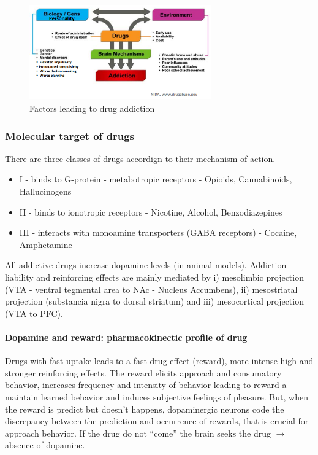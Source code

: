 \documentclass[12pt,article,oneside,a4paper]{memoir}
\begin{document}
\begin{figure}
  \centering
  \includegraphics[width=0.7\textwidth]{imgs/drug-addiction-factors.png}
  \caption{Factors leading to drug addiction}
  \label{fig:drug-addiction-factors}
\end{figure}

\subsubsection{Molecular target of drugs}
There are three classes of drugs accordign to their mechanism of action.

\begin{itemize}
\item I - binds to G-protein - metabotropic receptors - Opioids, Cannabinoids,
Hallucinogens
\item II - binds to ionotropic receptors - Nicotine, Alcohol, Benzodiazepines
\item III - interacts with monoamine transporters (GABA receptors) - Cocaine,
Amphetamine
\end{itemize}

All addictive drugs increase dopamine levels (in animal models). Addiction
liability and reinforcing effects are mainly mediated by i) mesolimbic
projection (VTA - ventral tegmental area to NAc - Nucleus Accumbens), ii)
mesostriatal projection (substancia nigra to dorsal striatum) and iii)
mesocortical projection (VTA to PFC).

\paragraph{Dopamine and reward: pharmacokinectic profile of drug}
Drugs with fast uptake leads to a fast drug effect (reward), more intense high
and stronger reinforcing effects.
The reward elicits approach and consumatory behavior, increases frequency and
intensity of behavior leading to reward a maintain learned behavior and induces
subjective feelings of pleasure. But, when the reward is predict but doesn't
happens, dopaminergic neurons code the discrepancy between the prediction and
occurrence of rewards, that is crucial for approach behavior. If the drug do
not ``come'' the brain seeks the drug $\rightarrow$ absence of dopamine.
\end{document}
